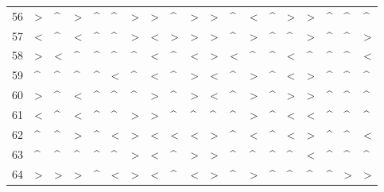 \begin{tabular}{lllllllllllllllllll}
56  &  > &  \textasciicircum  &  > &  \textasciicircum  &  \textasciicircum  &  > &  > &  \textasciicircum  &  > &  > &  \textasciicircum  &  < &  \textasciicircum  &  > &  > &  \textasciicircum  &  \textasciicircum  &  \textasciicircum  \\
57  &  < &  \textasciicircum  &  < &  \textasciicircum  &  \textasciicircum  &  > &  < &  > &  > &  > &  \textasciicircum  &  > &  \textasciicircum  &  \textasciicircum  &  > &  \textasciicircum  &  \textasciicircum  &  > \\
58  &  > &  < &  \textasciicircum  &  \textasciicircum  &  \textasciicircum  &  \textasciicircum  &  < &  \textasciicircum  &  < &  > &  < &  \textasciicircum  &  \textasciicircum  &  < &  \textasciicircum  &  \textasciicircum  &  \textasciicircum  &  < \\
59  &  \textasciicircum  &  \textasciicircum  &  \textasciicircum  &  \textasciicircum  &  < &  \textasciicircum  &  < &  \textasciicircum  &  > &  < &  \textasciicircum  &  > &  \textasciicircum  &  < &  > &  \textasciicircum  &  \textasciicircum  &  \textasciicircum  \\
60  &  > &  \textasciicircum  &  < &  \textasciicircum  &  \textasciicircum  &  \textasciicircum  &  > &  \textasciicircum  &  > &  < &  \textasciicircum  &  > &  \textasciicircum  &  > &  > &  \textasciicircum  &  \textasciicircum  &  \textasciicircum  \\
61  &  < &  \textasciicircum  &  < &  \textasciicircum  &  \textasciicircum  &  > &  > &  \textasciicircum  &  \textasciicircum  &  \textasciicircum  &  \textasciicircum  &  > &  \textasciicircum  &  < &  < &  \textasciicircum  &  \textasciicircum  &  \textasciicircum  \\
62  &  \textasciicircum  &  \textasciicircum  &  > &  \textasciicircum  &  < &  > &  < &  < &  < &  > &  \textasciicircum  &  < &  \textasciicircum  &  < &  > &  \textasciicircum  &  \textasciicircum  &  < \\
63  &  \textasciicircum  &  \textasciicircum  &  \textasciicircum  &  \textasciicircum  &  \textasciicircum  &  > &  < &  \textasciicircum  &  > &  > &  \textasciicircum  &  \textasciicircum  &  \textasciicircum  &  \textasciicircum  &  < &  \textasciicircum  &  \textasciicircum  &  \textasciicircum  \\
64  &  > &  > &  > &  \textasciicircum  &  < &  > &  < &  \textasciicircum  &  < &  > &  \textasciicircum  &  > &  \textasciicircum  &  \textasciicircum  &  \textasciicircum  &  \textasciicircum  &  > &  > \\

\end{tabular}
